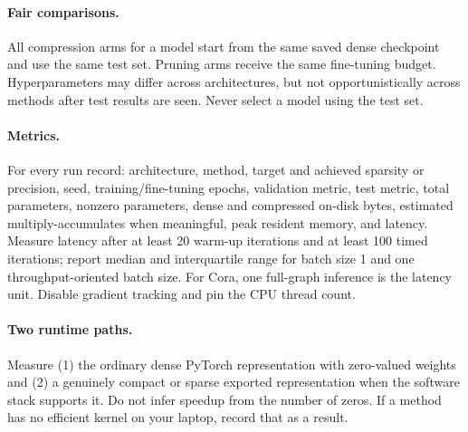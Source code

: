 \documentclass[11pt,letterpaper]{article}
\begin{document}
\paragraph{Fair comparisons.}
All compression arms for a model start from the same saved dense checkpoint and use the same test set. Pruning arms receive the same fine-tuning budget. Hyperparameters may differ across architectures, but not opportunistically across methods after test results are seen. Never select a model using the test set.

\paragraph{Metrics.}
For every run record: architecture, method, target and achieved sparsity or precision, seed, training/fine-tuning epochs, validation metric, test metric, total parameters, nonzero parameters, dense and compressed on-disk bytes, estimated multiply-accumulates when meaningful, peak resident memory, and latency. Measure latency after at least 20 warm-up iterations and at least 100 timed iterations; report median and interquartile range for batch size 1 and one throughput-oriented batch size. For Cora, one full-graph inference is the latency unit. Disable gradient tracking and pin the CPU thread count.

\paragraph{Two runtime paths.}
Measure (1) the ordinary dense PyTorch representation with zero-valued weights and (2) a genuinely compact or sparse exported representation when the software stack supports it. Do not infer speedup from the number of zeros. If a method has no efficient kernel on your laptop, record that as a result.

\clearpage
\end{document}
